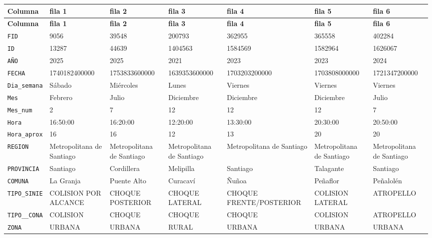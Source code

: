 \documentclass[10pt]{article}
\newcommand{\hdr}[1]{\textbf{\color{white}#1}}
\begin{document}
\footnotesize
\begin{xltabular}{\linewidth}{@{}p{4.3cm} Y Y Y Y Y Y @{}}
\hdr{Columna} & \hdr{fila 1} & \hdr{fila 2} & \hdr{fila 3} & \hdr{fila 4} & \hdr{fila 5} & \hdr{fila 6} \\
\endfirsthead
{}\hdr{Columna} & \hdr{fila 1} & \hdr{fila 2} & \hdr{fila 3} & \hdr{fila 4} & \hdr{fila 5} & \hdr{fila 6} \\
\endhead
{}\texttt{FID} & 9056 & 39548 & 200793 & 362955 & 365558 & 402284 \\
\texttt{ID} & 13287 & 44639 & 1404563 & 1584569 & 1582964 & 1626067 \\
\texttt{AÑO} & 2025 & 2025 & 2021 & 2023 & 2023 & 2024 \\
\texttt{FECHA} & 1740182400000 & 1753833600000 & 1639353600000 & 1703203200000 & 1703808000000 & 1721347200000 \\
\texttt{Dia\_\allowbreak{}semana} & Sábado & Miércoles & Lunes & Viernes & Viernes & Viernes \\
\texttt{Mes} & Febrero & Julio & Diciembre & Diciembre & Diciembre & Julio \\
\texttt{Mes\_\allowbreak{}num} & 2 & 7 & 12 & 12 & 12 & 7 \\
\texttt{Hora} & 16:50:00 & 16:20:00 & 12:20:00 & 13:30:00 & 20:30:00 & 20:50:00 \\
\texttt{Hora\_\allowbreak{}aprox} & 16 & 16 & 12 & 13 & 20 & 20 \\
\texttt{REGION} & Metropolitana de Santiago & Metropolitana de Santiago & Metropolitana de Santiago & Metropolitana de Santiago & Metropolitana de Santiago & Metropolitana de Santiago \\
\texttt{PROVINCIA} & Santiago & Cordillera & Melipilla & Santiago & Talagante & Santiago \\
\texttt{COMUNA} & La Granja & Puente Alto & Curacaví & Ñuñoa & Peñaflor & Peñalolén \\
\texttt{TIPO\_\allowbreak{}SINIE} & COLISION POR ALCANCE & CHOQUE POSTERIOR & CHOQUE LATERAL & CHOQUE FRENTE/PO\allowbreak{}STERIOR & COLISION LATERAL & ATROPELLO \\
\texttt{TIPO\_\allowbreak{}\_\allowbreak{}CONA} & COLISION & CHOQUE & CHOQUE & CHOQUE & COLISION & ATROPELLO \\
\texttt{ZONA} & URBANA & URBANA & RURAL & URBANA & URBANA & URBANA \\

\end{xltabular}
\end{document}
